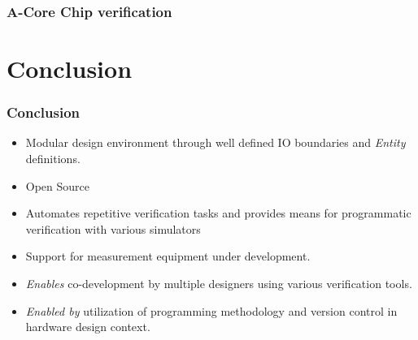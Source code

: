 \documentclass{sdkslides}
\newcommand{\sectname}{Section Name}
\begin{document}
\begin{frame}[c]
    \frametitle{A-Core Chip verification }
    \begin{center}
    \end{center}
\end{frame}

\renewcommand{\sectname}{Conclusion}
\section{\sectname}
\begin{frame}[t]
    \frametitle{\sectname}
    \begin{itemize}
        \item Modular design environment through well defined IO boundaries and
            \emph{Entity} definitions.
        \item Open Source
        \item Automates repetitive verification tasks and provides means for programmatic
            verification with various simulators
        \item Support for measurement equipment under development.
        \item \emph{Enables} co-development by multiple designers using various
            verification tools.
        \item \emph{Enabled by} utilization of programming methodology and
            version control in hardware design context.
    \end{itemize}
\end{frame}
\end{document}
